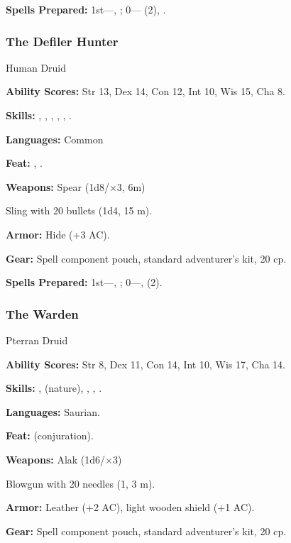 \textbf{Spells Prepared:} 1st---, ; 0--- (2), .

\subsubsection{The Defiler Hunter}

Human Druid

\textbf{Ability Scores:} Str 13, Dex 14, Con 12, Int 10, Wis 15, Cha 8.

\textbf{Skills:} , , , , , .

\textbf{Languages:} Common

\textbf{Feat:} , .

\textbf{Weapons:} Spear (1d8/$\times$3, 6m)

Sling with 20 bullets (1d4, 15 m).

\textbf{Armor:} Hide (+3 AC).

\textbf{Gear:} Spell component pouch, standard adventurer's kit, 20 cp.


\textbf{Spells Prepared:} 1st---, ;\hskip10pt 0---,  (2).

\subsubsection{The Warden}

Pterran Druid

\textbf{Ability Scores:} Str 8, Dex 11, Con 14, Int 10, Wis 17, Cha 14.

\textbf{Skills:} ,  (nature), , , .

\textbf{Languages:} Saurian.

\textbf{Feat:}  (conjuration).

\textbf{Weapons:} Alak (1d6/$\times$3)

Blowgun with 20 needles (1, 3 m).

\textbf{Armor:} Leather (+2 AC), light wooden shield (+1 AC).

\textbf{Gear:} Spell component pouch, standard adventurer's kit, 20 cp.

